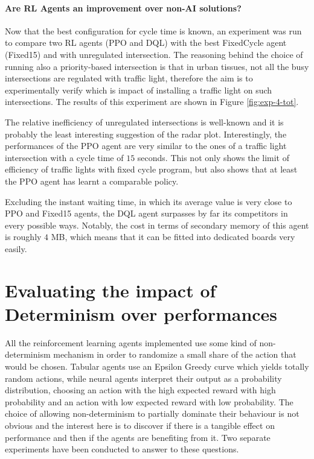 
\paragraph{Are RL Agents an improvement over non-AI solutions?}

Now that the best configuration for cycle time is known, an experiment was run to compare two RL agents (PPO and DQL) with the best FixedCycle agent (Fixed15) and with unregulated intersection.
The reasoning behind the choice of running also a priority-based intersection is that in urban tissues, not all the busy intersections are regulated with traffic light, therefore the aim is to experimentally verify which is impact of installing a traffic light on such intersections. The results of this experiment are shown in Figure \ref{fig:exp-4-tot}.

The relative inefficiency of unregulated intersections is well-known and it is probably the least interesting suggestion of the radar plot.
Interestingly, the performances of the PPO agent are very similar to the ones of a traffic light intersection with a cycle time of $15$ seconds.
This not only shows the limit of efficiency of traffic lights with fixed cycle program, but also shows that at least the PPO agent has learnt a comparable policy.

Excluding the instant waiting time, in which its average value is very close to PPO and Fixed15 agents, the DQL agent surpasses by far its competitors in every possible ways.
Notably, the cost in terms of secondary memory of this agent is roughly $4$ MB, which means that it can be fitted into dedicated boards very easily.


\section{Evaluating the impact of Determinism over performances}

All the reinforcement learning agents implemented use some kind of non-determinism mechanism in order to randomize a small share of the action that would be chosen. Tabular agents use an Epsilon Greedy curve which yields totally random actions, while neural agents interpret their output as a probability distribution, choosing an action with the high expected reward with high probability and an action with low expected reward with low probability. The choice of allowing non-determinism to partially dominate their behaviour is not obvious and the interest here is to discover if there is a tangible effect on performance and then if the agents are benefiting from it. Two separate experiments have been conducted to answer to these questions.

